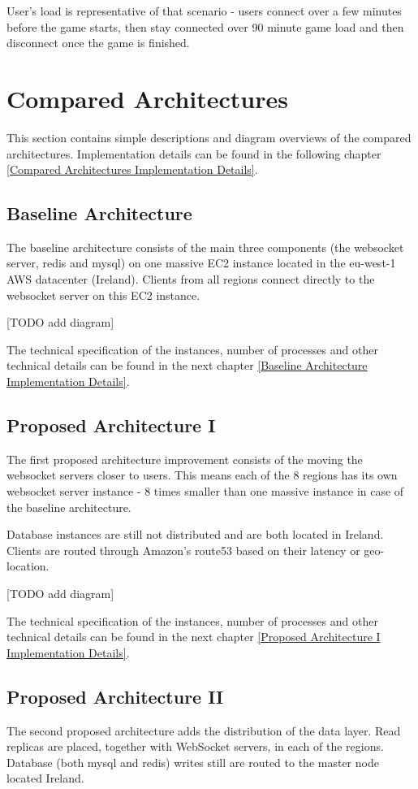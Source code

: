 \documentclass{uvamscse}
\begin{document}
User's load is representative of that scenario - users connect over a few minutes before the game starts, then stay connected over 90 minute game load and then disconnect once the game is finished.

\section{Compared Architectures}\label{Compared Architectures}

This section contains simple descriptions and diagram overviews of the compared architectures. Implementation details can be found in the following chapter \ref{Compared Architectures Implementation Details}.

\subsection{Baseline Architecture}\label{Baseline Architecture}
The baseline architecture consists of the main three components (the websocket server, redis and mysql) on one massive EC2 instance located in the eu-west-1 AWS datacenter (Ireland). Clients from all regions connect directly to the websocket server on this EC2 instance.

[TODO add diagram]

The technical specification of the instances, number of processes and other technical details can be found in the next chapter \ref{Baseline Architecture Implementation Details}.

\subsection{Proposed Architecture I}\label{Proposed Architecture I}
The first proposed architecture improvement consists of the moving the websocket servers closer to users. This means each of the 8 regions has its own websocket server instance - 8 times smaller than one massive instance in case of the baseline architecture.

Database instances are still not distributed and are both located in Ireland. Clients are routed through Amazon's route53 based on their latency or geo-location.

[TODO add diagram]

The technical specification of the instances, number of processes and other technical details can be found in the next chapter \ref{Proposed Architecture I Implementation Details}.

\subsection{Proposed Architecture II}\label{Proposed Architecture II}
The second proposed architecture adds the distribution of the data layer. Read replicas are placed, together with WebSocket servers, in each of the regions. Database (both mysql and redis) writes still are routed to the master node located Ireland.
\end{document}
